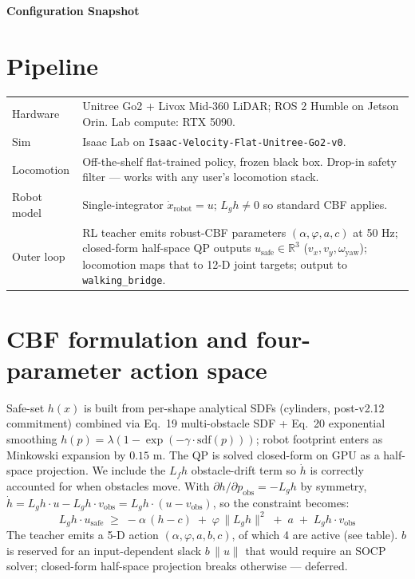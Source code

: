 \documentclass[11pt]{article}
\newcommand{\R}{\mathbb{R}}
\begin{document}
\begin{center}
{\Large\bfseries Configuration Snapshot}
\end{center}

\vspace{-1ex}

\section{Pipeline}

\begin{small}
\begin{tabularx}{\linewidth}{@{}lX@{}}
\toprule
Hardware    & Unitree Go2 + Livox Mid-360 LiDAR; ROS 2 Humble on Jetson Orin. Lab compute: RTX 5090. \\
Sim         & Isaac Lab on \texttt{Isaac-Velocity-Flat-Unitree-Go2-v0}. \\
Locomotion  & Off-the-shelf flat-trained policy, frozen black box. Drop-in safety filter --- works with any user's locomotion stack. \\
Robot model & Single-integrator $\dot{x}_{\text{robot}} = u$; $L_g h \neq 0$ so standard CBF applies. \\
Outer loop  & RL teacher emits robust-CBF parameters $(\alpha,\varphi,a,c)$ at 50 Hz; closed-form half-space QP outputs $u_{\text{safe}} \in \R^{3}$ ($v_x, v_y, \omega_{\text{yaw}}$); locomotion maps that to 12-D joint targets; output to \texttt{walking\_bridge}. \\
\bottomrule
\end{tabularx}
\end{small}

\section{CBF formulation and four-parameter action space}

Safe-set $h(x)$ is built from per-shape analytical SDFs (cylinders, post-v2.12
commitment) combined via Eq.~19 multi-obstacle SDF + Eq.~20 exponential
smoothing $h(p) = \lambda(1 - \exp(-\gamma \cdot \text{sdf}(p)))$; robot footprint
enters as Minkowski expansion by $0.15$ m. The QP is solved closed-form on GPU
as a half-space projection. We include the $L_f h$ obstacle-drift term so
$\dot h$ is correctly accounted for when obstacles move. With
$\partial h / \partial p_{\text{obs}} = -L_g h$ by symmetry,
$\dot h = L_g h \cdot u - L_g h \cdot v_{\text{obs}} = L_g h \cdot (u -
v_{\text{obs}})$, so the constraint becomes:
\[
  L_g h \cdot u_{\text{safe}}
  \;\geq\;
  -\alpha\,(h - c) \;+\; \varphi \,\lVert L_g h\rVert^{2} \;+\; a
  \;+\; L_g h \cdot v_{\text{obs}}
\]
The teacher emits a 5-D action $(\alpha,\varphi,a,b,c)$, of which 4 are active
(see table). $b$ is reserved for an input-dependent slack $b\,\lVert u\rVert$
that would require an SOCP solver; closed-form half-space projection breaks
otherwise --- deferred.
\end{document}
